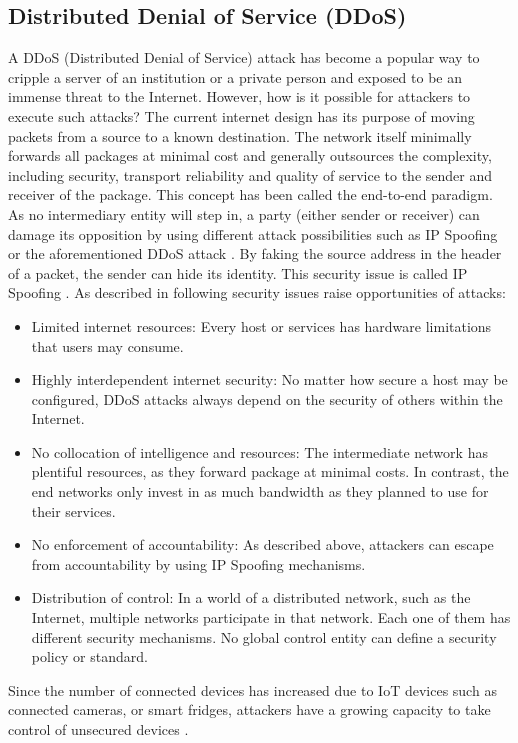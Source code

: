 \subsection{Distributed Denial of Service (DDoS)}
\label{subsec:03_ddos}

A DDoS (Distributed Denial of Service) attack has become a popular way to cripple a server of an institution or a private person and exposed to be an immense threat to the Internet. However, how is it possible for attackers to execute such attacks? The current internet design has its purpose of moving packets from a source to a known destination. The network itself minimally forwards all packages at minimal cost and generally outsources the complexity, including security, transport reliability and quality of service to the sender and receiver of the package. This concept has been called the end-to-end paradigm. As no intermediary entity will step in, a party (either sender or receiver) can damage its opposition by using different attack possibilities such as IP Spoofing or the aforementioned DDoS attack \cite{Mirkovic2004}. By faking the source address in the header of a packet, the sender can hide its identity. This security issue is called IP Spoofing \cite{Cloudflare2019}. As described in \citet{Mirkovic2004} following security issues raise opportunities of attacks:
\begin{itemize}
    \item Limited internet resources: Every host or services has hardware limitations that users may consume.
    \item Highly interdependent internet security: No matter how secure a host may be configured, DDoS attacks always depend on the security of others within the Internet.
    \item No collocation of intelligence and resources: The intermediate network has plentiful resources, as they forward package at minimal costs.  In contrast, the end networks only invest in as much bandwidth as they planned to use for their services.
    \item No enforcement of accountability: As described above, attackers can escape from accountability by using IP Spoofing mechanisms.
    \item Distribution of control: In a world of a distributed network, such as the Internet, multiple networks participate in that network. Each one of them has different security mechanisms. No global control entity can define a security policy or standard.
\end{itemize}
Since the number of connected devices has increased due to IoT devices such as connected cameras, or smart fridges, attackers have a growing capacity to take control of unsecured devices \cite{Rodrigues2017a}.

